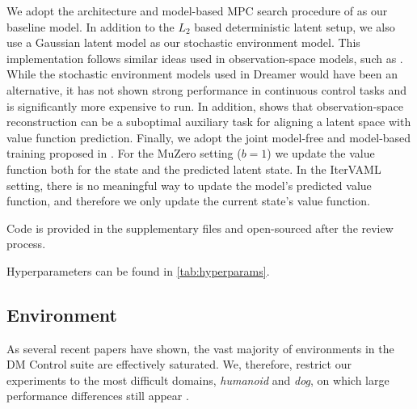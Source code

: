 We adopt the architecture and model-based MPC search procedure of \textcite{hansen2022temporal} as our baseline model.
In addition to the $L_2$ based deterministic latent setup, we also use a Gaussian latent model as our stochastic environment model.
This implementation follows similar ideas used in observation-space models, such as \textcite{pets,mbpo}.
While the stochastic environment models used in Dreamer \parencite{hafner2021mastering} would have been an alternative, it has not shown strong performance in continuous control tasks and is significantly more expensive to run.
In addition, \textcite{voelcker2024when} shows that observation-space reconstruction can be a suboptimal auxiliary task for aligning a latent space with value function prediction.
Finally, we adopt the joint model-free and model-based training proposed in \textcite{voelcker2024mad}.
For the MuZero setting ($b=1$) we update the value function both for the state and the predicted latent state.
In the IterVAML setting, there is no meaningful way to update the model's predicted value function, and therefore we only update the current state's value function.

Code is provided in the supplementary files and open-sourced after the review process.

Hyperparameters can be found in \autoref{tab:hyperparams}.

\subsection{Environment}
\label{app:stoch_env}
As several recent papers have shown, the vast majority of environments in the DM Control suite are effectively saturated. 
We, therefore, restrict our experiments to the most difficult domains, \emph{humanoid} and \emph{dog}, on which large performance differences still appear \parencite{nauman2024bigger,voelcker2024mad,fujimoto2025towards}.

% 

